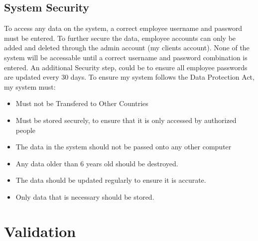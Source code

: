 \begin{python}
\subsection{System Security}
To access any data on the system, a correct employee username and password must be entered. To further secure the data, employee accounts can only be added and deleted through the admin account (my clients account). None of the system will be accessable until a correct username and password combination is entered. An additional Security step, could be to ensure all employee passwords are updated every 30 days. To ensure my system follows the Data Protection Act, my system must: \par \par
\begin{itemize}
\item Must not be Transfered to Other Countries
\item Must be stored securely, to ensure that it is only accessed by authorized people
\item The data in the system should not be passed onto any other computer
\item Any data older than 6 years old should be destroyed.
\item The data should be updated regularly to ensure it is accurate.
\item Only data that is necessary should be stored.
\end{itemize}


\section{Validation}



\end{python}
